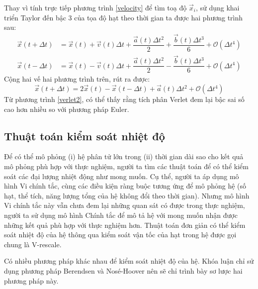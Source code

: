 \documentclass[12pt,a4paper,reqno, oneside]{book}
\begin{document}
		Thay vì tính trực tiếp phương trình \eqref{velocity} để tìm toạ độ $\vec{x}_i$, sử dụng khai triển Taylor đến bậc 3 của tọa độ hạt theo thời gian ta được hai phương trình sau:
		\begin{align}
		\vec{x}\left(t+\Delta t\right) &=\vec{x}\left(t\right)+\vec{v}\left(t\right)\Delta t + \dfrac{\vec{a}\left(t\right)\Delta t^{2}}{2} + \dfrac{\vec{b}\left(t\right)\Delta t^{3}}{6} + \mathcal{O}\left(\Delta t^{4}\right)\\
		\vec{x}\left(t-\Delta t\right) &=\vec{x}\left(t\right)-\vec{v}\left(t\right)\Delta t + \dfrac{\vec{a}\left(t\right)\Delta t^{2}}{2} - \dfrac{\vec{b}\left(t\right)\Delta t^{3}}{6} + \mathcal{O}\left(\Delta t^{4}\right)
		\label{verlet1}
		\end{align}
		Cộng hai vế hai phương trình trên, rút ra được:
		\begin{equation}
		\vec{x}\left(t+\Delta t\right)=2\vec{x}\left(t\right)-\vec{x}\left(t-\Delta t\right)+\vec{a}\left(t\right)\Delta t^{2}+\mathcal{O}\left(\Delta t^{4}\right)
		\label{verlet2}
		\end{equation}
		Từ phương trình \eqref{verlet2}, có thể thấy rằng tích phân Verlet đem lại bậc sai số cao hơn nhiều so với phương pháp Euler.
	\subsection{Thuật toán kiểm soát nhiệt độ}
	\label{v-rescale}
		Để có thể mô phỏng (i) hệ phân tử lớn trong (ii) thời gian dài sao cho kết quả mô phỏng phù hợp với thực nghiệm, người ta tìm các thuật toán để có thể kiểm soát các đại lượng nhiệt động như mong muốn. Cụ thể, người ta áp dụng mô hình Vi chính tắc, cùng các điều kiện ràng buộc tương ứng để mô phỏng hệ (số hạt, thể tích, năng lượng tổng của hệ không đổi theo thời gian). Nhưng mô hình Vi chính tắc này vẫn chưa đem lại những quan sát có được trong thực nghiệm, người ta sử dụng mô hình Chính tắc để mô tả hệ với mong muốn nhận được những kết quả phù hợp với thực nghiệm hơn. Thuật toán đơn giản có thể kiểm soát nhiệt độ của hệ thông qua kiểm soát vận tốc của hạt trong hệ được gọi chung là V-rescale.
		
		Có nhiều phương pháp khác nhau để kiểm soát nhiệt độ của hệ. Khóa luận chỉ sử dụng phương pháp Berendsen và Nosé-Hoover nên sẽ chỉ trình bày sơ lược hai phương pháp này\cite{Bussi2007}.
		
\end{document}
